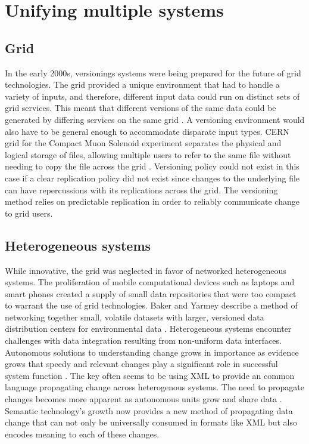 \section{Unifying multiple systems}
\subsection{Grid}
In the early 2000s, versionings systems were being prepared for the future of grid technologies.
The grid provided a unique environment that had to handle a variety of inputs, and therefore, different input data could run on distinct sets of grid services.
This meant that different versions of the same data could be generated by differing services on the same grid \cite{Kovse2003VGridAVS}.
A versioning environment would also have to be general enough to accommodate disparate input types.
CERN grid for the Compact Muon Solenoid experiment separates the physical and logical storage of files, allowing multiple users to refer to the same file without needing to copy the file across the grid \cite{Holtman:687353}.
Versioning policy could not exist in this case if a clear replication policy did not exist since changes to the underlying file can have repercussions with its replications across the grid.
The versioning method relies on predictable replication in order to reliably communicate change to grid users.
\subsection{Heterogeneous systems}
While innovative, the grid was neglected in favor of networked heterogeneous systems.
The proliferation of mobile computational devices such as laptops and smart phones created a supply of small data repositories that were too compact to warrant the use of grid technologies.
Baker and Yarmey describe a method of networking together small, volatile datasets with larger, versioned data distribution centers for environmental data \cite{Baker2009}.
Heterogeneous systems encounter challenges with data integration resulting from non-uniform data interfaces.
Autonomous solutions to understanding change grows in importance as evidence grows that speedy and relevant changes play a significant role in successful system function \cite{Bouzeghoub:2004:FAD:1012453.1012464}.
The key often seems to be using XML to provide an common language propagating change across heterogenous systems.
The need to propagate changes becomes more apparent as autonomous units grow and share data \cite{Systems02champagne:data}.
Semantic technology's growth now provides a new method of propagating data change that can not only be universally consumed in formats like XML but also encodes meaning to each of these changes.

